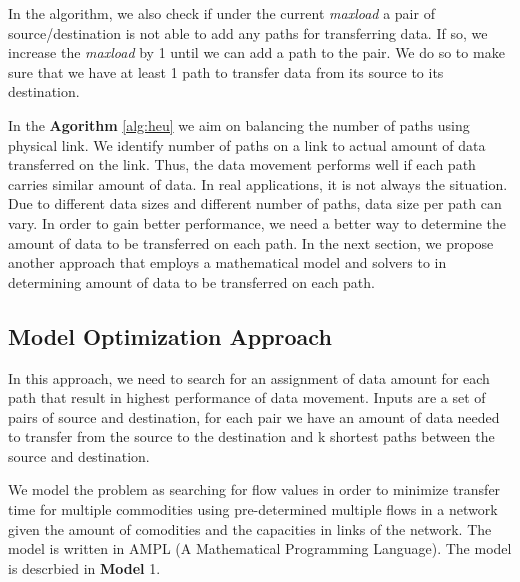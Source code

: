 In the algorithm, we also check if under the current \textit{maxload} a pair of source/destination is not able to add any paths for transferring data. If so, we increase the \textit{maxload} by 1 until we can add a path to the pair. We do so to make sure that we have at least 1 path to transfer data from its source to its destination.

In the \textbf{Agorithm} \ref{alg:heu} we aim on balancing the number of paths using physical link. We identify number of paths on a link to actual amount of data transferred on the link.  Thus, the data movement performs well if each path carries similar amount of data. In real applications, it is not always the situation. Due to different data sizes and different number of paths, data size per path can vary. In order to gain better performance, we need a better way to determine the amount of data to be transferred on each path. In the next section, we propose another approach that employs a mathematical model and solvers to in determining  amount of data to be transferred on each path. 

\subsection{Model Optimization Approach}

In this approach, we need to search for an assignment of data amount for each path that result in highest performance of data movement. Inputs are a set of pairs of source and destination, for each pair we have an amount of data needed to transfer from the source to the destination and k shortest paths between the source and destination.

We model the problem as searching for flow values in order to  minimize transfer time for multiple commodities using pre-determined multiple flows in a network given the amount of comodities and the capacities in links of the network. The model is written in AMPL (A Mathematical Programming Language). The model is descrbied in \textbf{Model} 1.

